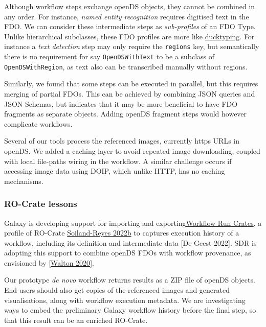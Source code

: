 Although workflow steps exchange openDS objects, they cannot be combined
in any order. For instance, \emph{named entity recognition} requires
digitised text in the FDO. We can consider these intermediate steps as
\emph{sub-profiles} of an FDO Type. Unlike hierarchical subclasses,
these FDO profiles are more like
\href{https://en.wikipedia.org/wiki/Duck_typing}{ducktyping}. For
instance a \emph{text detection} step may only require the
\texttt{regions} key, but semantically there is no requirement for say
\texttt{OpenDSWithText} to be a subclass of \texttt{OpenDSWithRegion},
as text also can be transcribed manually without regions.

Similarly, we found that some steps can be executed in parallel, but
this requires merging of partial FDOs. This can be achieved by combining
JSON queries and JSON Schemas, but indicates that it may be more
beneficial to have FDO fragments as separate objects. Adding openDS
fragment steps would however complicate workflows.

Several of our tools process the referenced images, currently https URLs
in openDS. We added a caching layer to avoid repeated image downloading,
coupled with local file-paths wiring in the workflow. A similar
challenge occurs if accessing image data using DOIP, which unlike HTTP,
has no caching mechanisms.

\hypertarget{ro-crate-lessons}{%
\subsubsection{RO-Crate lessons}\label{ro-crate-lessons}}

Galaxy is developing support for importing and
exporting\href{https://www.researchobject.org/workflow-run-crate/}{Workflow
Run Crates}, a profile of RO-Crate
\href{https://doi.org/10.3233/DS-210053}{Soiland-Reyes 2022b} to
captures execution history of a workflow, including its definition and
intermediate data {[}De Geest 2022{]}. SDR is adopting this support to
combine openDS FDOs with workflow provenance, as envisioned by
{[}\href{https://doi.org/10.3897/rio.6.e57602}{Walton 2020}{]}.

Our prototype \emph{de novo} workflow returns results as a ZIP file of
openDS objects. End-users should also get copies of the referenced
images and generated visualisations, along with workflow execution
metadata. We are investigating ways to embed the preliminary Galaxy
workflow history before the final step, so that this result can be an
enriched RO-Crate.

